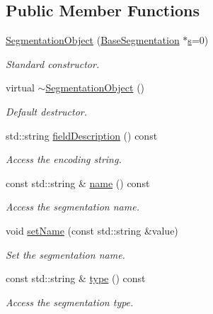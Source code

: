 \subsection*{Public Member Functions}
\begin{DoxyCompactItemize}
\item 
\hyperlink{class_d_d4hep_1_1_geometry_1_1_segmentation_object_a79ddebe4b3ce1664bac66bedff5dc096}{Segmentation\+Object} (\hyperlink{class_d_d4hep_1_1_geometry_1_1_segmentation_object_a57ca8eb515f079fdc61916df50468818}{Base\+Segmentation} $\ast$\hyperlink{_volumes_8cpp_a17ca6bfc8040d695d3cada22a4763d40}{s}=0)
\begin{DoxyCompactList}\small\item\em Standard constructor. \end{DoxyCompactList}\item 
virtual \hyperlink{class_d_d4hep_1_1_geometry_1_1_segmentation_object_ad2db3a9de2c3add55caf0c549cf93892}{$\sim$\+Segmentation\+Object} ()
\begin{DoxyCompactList}\small\item\em Default destructor. \end{DoxyCompactList}\item 
std\+::string \hyperlink{class_d_d4hep_1_1_geometry_1_1_segmentation_object_a1f40d9e8f8024eee33a7b7a29509f9c7}{field\+Description} () const
\begin{DoxyCompactList}\small\item\em Access the encoding string. \end{DoxyCompactList}\item 
const std\+::string \& \hyperlink{class_d_d4hep_1_1_geometry_1_1_segmentation_object_ae1e4b47501b2e0c27c7299abc19467b3}{name} () const
\begin{DoxyCompactList}\small\item\em Access the segmentation name. \end{DoxyCompactList}\item 
void \hyperlink{class_d_d4hep_1_1_geometry_1_1_segmentation_object_a2a00a3a453dd06de14f7341f8fb89aea}{set\+Name} (const std\+::string \&value)
\begin{DoxyCompactList}\small\item\em Set the segmentation name. \end{DoxyCompactList}\item 
const std\+::string \& \hyperlink{class_d_d4hep_1_1_geometry_1_1_segmentation_object_a1216616c2dce1fed63142d7ec139aa18}{type} () const
\begin{DoxyCompactList}\small\item\em Access the segmentation type. \end{DoxyCompactList}\item 

\end{DoxyCompactItemize}

